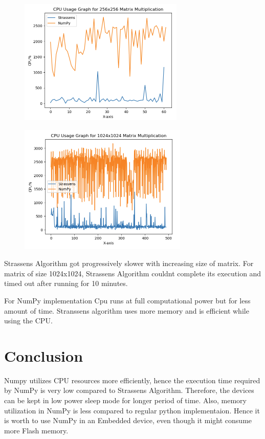 \documentclass[conference]{IEEEtran}
\begin{document}
    \begin{figure}[htbp]
    \centerline{\includegraphics{CPU_Usage_256x256.png}}
    \label{fig2}
    \end{figure}

    \begin{figure}[htbp]
    \centerline{\includegraphics{CPU_Usage_1024x1024.png}}
    \label{fig2}
    \end{figure}
    
    
    Strassen\textquotesingle s Algorithm got progressively slower with increasing size of matrix. For 
    matrix of size 1024x1024, Strassen\textquotesingle s Algorithm couldn\textquotesingle t complete it\textquotesingle s execution
    and timed out after running for 10 minutes. 
    
    For NumPy implementation Cpu runs at full computational power but for less amount of time. Stranssen\textquotesingle s algorithm uses more memory 
    and is efficient while using the CPU.

\section{Conclusion}
    Numpy utilizes CPU resources more efficiently, hence the execution time required by NumPy is very low compared
    to Strassen\textquotesingle s Algorithm. Therefore, the devices can be kept in low power sleep mode for longer 
    period of time. Also, memory utilization in NumPy is less compared to regular python implementaion. Hence
    it is worth to use NumPy in an Embedded device, even though it might consume more Flash memory.
\end{document}
